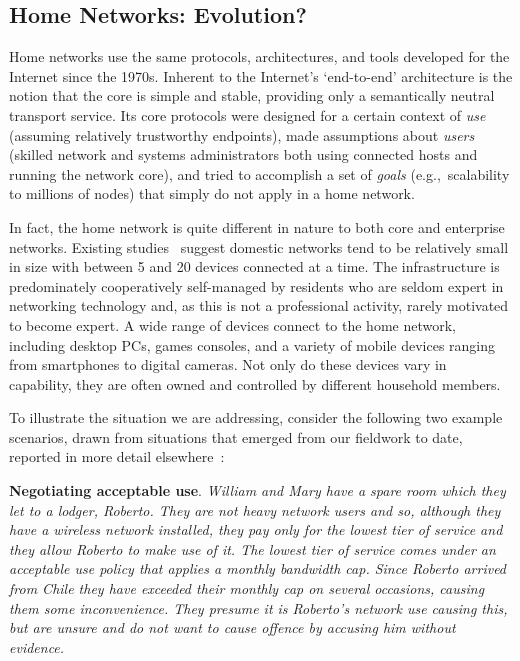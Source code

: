 \subsection{Home Networks: Evolution?}
\label{s:evolution}

Home networks use the same protocols, architectures, and tools
developed for the Internet since the 1970s.  Inherent to the
Internet's `end-to-end' architecture is the notion that the core is
simple and stable, providing only a semantically neutral transport
service.  Its core protocols were designed for a certain context of
\emph{use} (assuming relatively trustworthy endpoints), made
assumptions about \emph{users} (skilled network and systems
administrators both using connected hosts and running the network
core), and tried to accomplish a set of \emph{goals}
(e.g.,~scalability to millions of nodes) that simply do not apply in a
home network. 

In fact, the home network is quite different in nature to both core
and enterprise networks.  Existing
studies~\cite{tolmie07:_makin,shehan07:_home_networ_hci,shehanpoole08:_desig_inter_home_networ_maint_tools}
suggest domestic networks tend to be relatively small in size with
between 5 and 20 devices connected at a time.  The infrastructure is
predominately cooperatively self-managed by residents who are seldom
expert in networking technology and, as this is not a professional
activity, rarely motivated to become expert.  A wide range of devices
connect to the home network, including desktop PCs, games consoles,
and a variety of mobile devices ranging from smartphones to digital
cameras.  Not only do these devices vary in capability, they are often
owned and controlled by different household members.  

To illustrate the situation we are addressing, consider the following
two example scenarios, drawn from  situations that emerged from our
fieldwork to date, reported in more detail elsewhere~\cite{wmust2011}: 
 
\textbf{Negotiating acceptable use}.
{\it William and Mary have a spare room which they let to a lodger,
Roberto.  They are not heavy network users and so, although they have
a wireless network installed, they pay only for the lowest tier of
service and they allow Roberto to make use of it.  The lowest tier of
service comes under an acceptable use policy that applies a monthly
bandwidth cap.  Since Roberto arrived from Chile they have 
exceeded their monthly cap on several occasions, causing them some
inconvenience.  They presume it is Roberto's network use causing this,
but are unsure and do not want to cause offence by accusing him
without evidence.}


